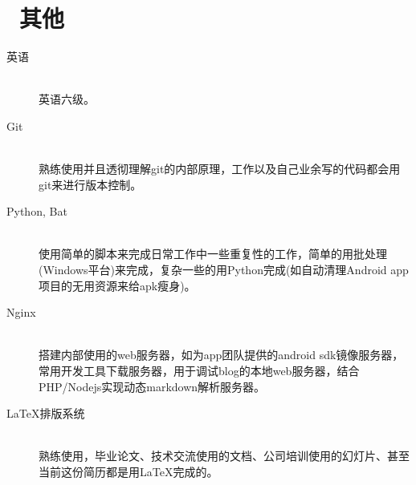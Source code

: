 \documentclass{resume}
\begin{document}
\section{\faInfo\ 其他}
\begin{description}
  \item[英语] \ \\ 英语六级。
  \item[Git] \ \\ 熟练使用并且透彻理解git的内部原理，工作以及自己业余写的代码都会用git来进行版本控制。
  \item[Python, Bat] \ \\ 使用简单的脚本来完成日常工作中一些重复性的工作，简单的用批处理(Windows平台)来完成，复杂一些的用Python完成(如自动清理Android app项目的无用资源来给apk瘦身)。
  \item[Nginx] \ \\ 搭建内部使用的web服务器，如为app团队提供的android sdk镜像服务器，常用开发工具下载服务器，用于调试blog的本地web服务器，结合PHP/Nodejs实现动态markdown解析服务器。
  \item[\LaTeX{}排版系统] \ \\ 熟练使用，毕业论文、技术交流使用的文档、公司培训使用的幻灯片、甚至当前这份简历都是用\LaTeX{}完成的。
\end{description}

%
%
\end{document}
